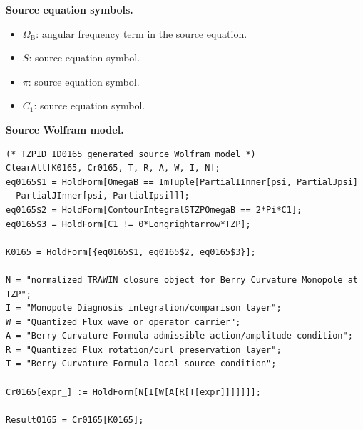 \begin{minipage}[t]{0.49\linewidth}
\begingroup
\small
\raggedright
\textbf{Source equation symbols.}\par
\begin{itemize}[leftmargin=1.35em,itemsep=1pt,topsep=1pt,parsep=0pt]
    \item $\Omega_{\mathrm{B}}$: angular frequency term in the source equation.
    \item $S$: source equation symbol.
    \item $\pi$: source equation symbol.
    \item $C_1$: source equation symbol.
\end{itemize}
\endgroup
\end{minipage}\hfill
\begin{minipage}[t]{0.47\linewidth}
\begingroup
\scriptsize
\raggedright
\textbf{Source Wolfram model.}\par
\begin{Verbatim}[fontsize=\tiny,breaklines=true,breakanywhere=true]
(* TZPID ID0165 generated source Wolfram model *)
ClearAll[K0165, Cr0165, T, R, A, W, I, N];
eq0165$1 = HoldForm[OmegaB == ImTuple[PartialIInner[psi, PartialJpsi] - PartialJInner[psi, PartialIpsi]]];
eq0165$2 = HoldForm[ContourIntegralSTZPOmegaB == 2*Pi*C1];
eq0165$3 = HoldForm[C1 != 0*Longrightarrow*TZP];

K0165 = HoldForm[{eq0165$1, eq0165$2, eq0165$3}];

N = "normalized TRAWIN closure object for Berry Curvature Monopole at TZP";
I = "Monopole Diagnosis integration/comparison layer";
W = "Quantized Flux wave or operator carrier";
A = "Berry Curvature Formula admissible action/amplitude condition";
R = "Quantized Flux rotation/curl preservation layer";
T = "Berry Curvature Formula local source condition";

Cr0165[expr_] := HoldForm[N[I[W[A[R[T[expr]]]]]]];

Result0165 = Cr0165[K0165];
\end{Verbatim}
\endgroup
\end{minipage}


